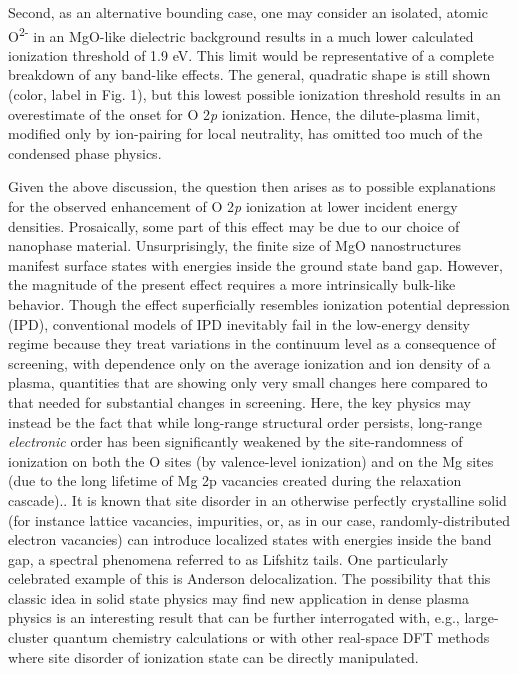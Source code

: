 Second, as an alternative bounding case, one may consider an isolated,
atomic O\textsuperscript{2-} in an MgO-like dielectric background
results in a much lower calculated ionization threshold of 1.9 eV. This
limit would be representative of a complete breakdown of any band-like
effects. The general, quadratic shape is still shown (color, label in
Fig. 1), but this lowest possible ionization threshold results in an
overestimate of the onset for O 2\emph{p} ionization. Hence, the
dilute-plasma limit, modified only by ion-pairing for local neutrality,
has omitted too much of the condensed phase physics.

Given the above discussion, the question then arises as to possible
explanations for the observed enhancement of O 2\emph{p} ionization at
lower incident energy densities. Prosaically, some part of this effect
may be due to our choice of nanophase material. Unsurprisingly, the
finite size of MgO nanostructures manifest surface states with energies
inside the ground state band gap.  However, the magnitude of the
present effect requires a more intrinsically bulk-like behavior. Though
the effect superficially resembles ionization potential depression
(IPD), conventional models of IPD inevitably fail in the low-energy
density regime because they treat variations in the continuum level as a
consequence of screening, with dependence only on the average ionization
and ion density of a plasma, quantities that are showing only very small
changes here compared to that needed for substantial changes in
screening. \cite{ciricosta2016measurements, vinko2014density} Here, the key physics may instead be the fact that
while long-range structural order persists, long-range \emph{electronic}
order has been significantly weakened by the site-randomness of
ionization on both the O sites (by valence-level ionization) and on the
Mg sites (due to the long lifetime of Mg 2p vacancies created during the
relaxation cascade).. It is known that site disorder in an otherwise
perfectly crystalline solid (for instance lattice vacancies, impurities,
or, as in our case, randomly-distributed electron vacancies) can
introduce localized states with energies inside the band gap, a spectral
phenomena referred to as Lifshitz tails. \cite{nieuwenhuizen1989trapping} One particularly
celebrated example of this is Anderson delocalization. \cite{de1998delocalization} The
possibility that this classic idea in solid state physics may find new
application in dense plasma physics is an interesting result that can be
further interrogated with, e.g., large-cluster quantum chemistry
calculations or with other real-space DFT methods where site disorder of
ionization state can be directly manipulated.

